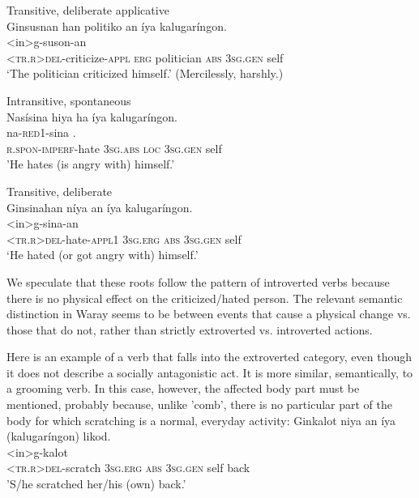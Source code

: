 \documentclass[output=paper]{langscibook}
\begin{document}
\ex
Transitive, deliberate applicative\\
\glll
Ginsusnan han politiko an íya kalugaríngon.\\
 <in>g-suson-an { } { } { } { } { } \\
 \textsc{<tr.r}>\textsc{del-}criticize-\textsc{appl} \textsc{erg} politician \textsc{abs} 3\textsc{sg.gen} self\\
 \glt ‘The politician criticized himself.' (Mercilessly, harshly.)
\z
\z

\ea
\label{ex:Payne:24}
 Intransitive, spontaneous\\
\ea
\glll
Nasísina hiya ha íya kalugaríngon.\\
 na-\textsc{red}1-sina { } { } { } { } .\\
 \textsc{r.spon-imperf}-hate 3\textsc{sg.abs} \textsc{loc} \textsc{3sg.gen} self\\
 \glt'He hates (is angry with) himself.'
 

 
 \ex
  Transitive, deliberate\\
  \glll
 Ginsinahan níya an íya kalugaríngon.\\
 <in>g-sina-an { } { } { } { } \\
 \textsc{<tr.r}>\textsc{del-}hate-\textsc{appl}1 3\textsc{sg.erg} \textsc{abs} 3\textsc{sg.gen} self\\
\glt ‘He hated (or got angry with) himself.'
\z
\z


We speculate that these roots follow the pattern of introverted verbs because there is no physical effect on the criticized/hated person. The relevant semantic distinction in Waray seems to be between events that cause a physical change vs. those that do not, rather than strictly extroverted vs. introverted actions. 

Here is an example of a verb that falls into the extroverted category, even though it does not describe a socially antagonistic act. It is more similar, semantically, to a grooming verb. In this case, however, the affected body part must be mentioned, probably because, unlike 'comb', there is no particular part of the body for which scratching is a normal, everyday activity:
\ea
\label{ex:Payne:25}
\glll
{Ginkalot} {niya} {an} {íya} {(kalugaríngon)} {likod.} \\
<in>g-kalot { } { } { } { } { } \\
\textsc{<tr.r}>\textsc{del}{}-scratch 3\textsc{sg.erg} \textsc{abs} 3\textsc{sg.gen} self back\\
\glt'S/he scratched her/his (own) back.' 
\z
\end{document}
